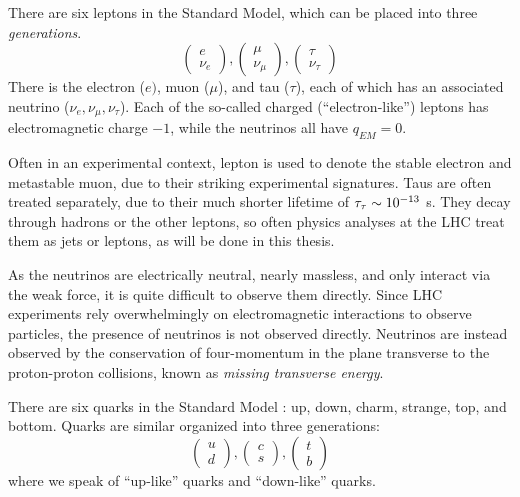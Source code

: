 There are six leptons in the Standard Model, which can be placed into three \textit{generations}.
\begin{equation}
\begin{pmatrix} e \\ \nu_e \end{pmatrix} , \begin{pmatrix} \mu \\ \nu_\mu \end{pmatrix}, \begin{pmatrix} \tau \\ \nu_\tau \end{pmatrix}
\end{equation}
There is the electron ($e)$, muon ($\mu$), and tau ($\tau$), each of which has an associated neutrino ($\nu_e, \nu_\mu, \nu_\tau$).
Each of the so-called charged (``electron-like'') leptons has electromagnetic charge $-1$, while the neutrinos all have $q_{EM} = 0$.

Often in an experimental context, lepton is used to denote the stable electron and metastable muon, due to their striking experimental signatures.
Taus are often treated separately, due to their much shorter lifetime of $\tau_{\tau} \sim 10^{-13}$ s.
They decay through hadrons or the other leptons, so often physics analyses at the LHC treat them as jets or leptons, as will be done in this thesis.

As the neutrinos are electrically neutral, nearly massless, and only interact via the weak force, it is quite difficult to observe them directly.
Since LHC experiments rely overwhelmingly on electromagnetic interactions to observe particles, the presence of neutrinos is not observed directly.
Neutrinos are instead observed by the conservation of four-momentum in the plane transverse to the proton-proton collisions, known as \textit{missing transverse energy}.

There are six quarks in the Standard Model : up, down, charm, strange, top, and bottom.
Quarks are similar organized into three generations:
\begin{equation}
\begin{pmatrix} u \\ d \end{pmatrix} , \begin{pmatrix} c \\ s \end{pmatrix}, \begin{pmatrix} t \\ b \end{pmatrix}
\end{equation}
where we speak of ``up-like'' quarks and ``down-like'' quarks.

